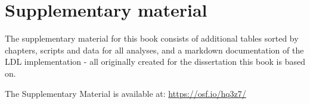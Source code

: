 \chapter{Supplementary material}\label{Supplementary Material}

The supplementary material for this book consists of additional tables sorted by chapters, scripts and data for all analyses, and a markdown documentation of the LDL implementation - all originally created for the dissertation this book is based on. 

The Supplementary Material is available at: \url{https://osf.io/hq3z7/}
